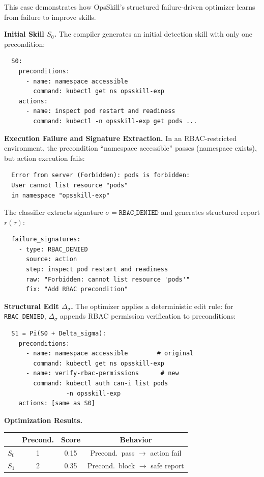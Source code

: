 \documentclass[conference,10pt]{IEEEtran}
\begin{document}
This case demonstrates how OpsSkill's structured failure-driven optimizer learns from failure to improve skills.

\textbf{Initial Skill $S_0$.}
The compiler generates an initial detection skill with only one precondition:

{\footnotesize
\begin{verbatim}
  S0:
    preconditions:
      - name: namespace accessible
        command: kubectl get ns opsskill-exp
    actions:
      - name: inspect pod restart and readiness
        command: kubectl -n opsskill-exp get pods ...
\end{verbatim}
}

\textbf{Execution Failure and Signature Extraction.}
In an RBAC-restricted environment, the precondition ``namespace accessible'' passes (namespace exists), but action execution fails:

{\footnotesize
\begin{verbatim}
  Error from server (Forbidden): pods is forbidden:
  User cannot list resource "pods"
  in namespace "opsskill-exp"
\end{verbatim}
}

\noindent The classifier extracts signature $\sigma = \texttt{RBAC\_DENIED}$ and generates structured report $r(\tau)$:

{\footnotesize
\begin{verbatim}
  failure_signatures:
    - type: RBAC_DENIED
      source: action
      step: inspect pod restart and readiness
      raw: "Forbidden: cannot list resource 'pods'"
      fix: "Add RBAC precondition"
\end{verbatim}
}

\textbf{Structural Edit $\Delta_\sigma$.}
The optimizer applies a deterministic edit rule: for \texttt{RBAC\_DENIED}, $\Delta_\sigma$ appends RBAC permission verification to preconditions:

{\footnotesize
\begin{verbatim}
  S1 = Pi(S0 + Delta_sigma):
    preconditions:
      - name: namespace accessible        # original
        command: kubectl get ns opsskill-exp
      - name: verify-rbac-permissions      # new
        command: kubectl auth can-i list pods
                 -n opsskill-exp
    actions: [same as S0]
\end{verbatim}
}

\textbf{Optimization Results.}

{\small
\begin{center}
\begin{tabular}{lccc}
\toprule
& \textbf{Precond.} & \textbf{Score} & \textbf{Behavior} \\
\midrule
$S_0$ & 1 & 0.15 & Precond.\ pass $\to$ action fail \\
$S_1$ & 2 & 0.35 & Precond.\ block $\to$ safe report \\
\bottomrule
\end{tabular}
\end{center}
}
\end{document}
